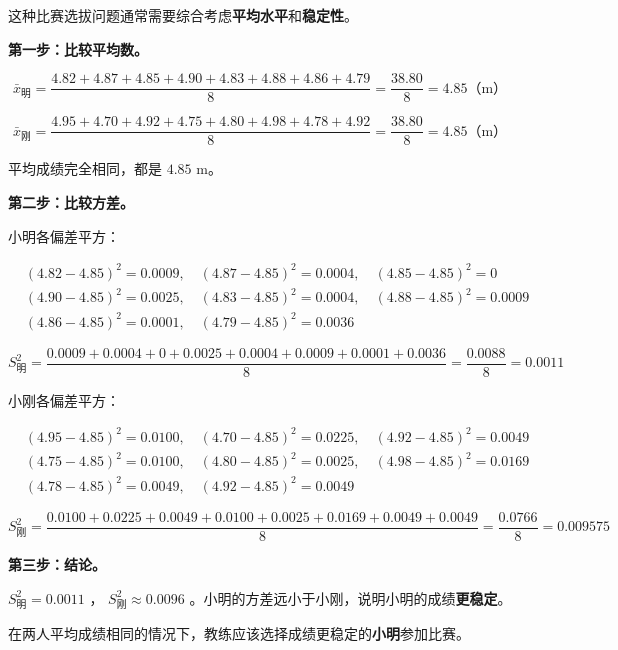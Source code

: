 \begin{understand}


这种比赛选拔问题通常需要综合考虑\textbf{平均水平}和\textbf{稳定性}。

\textbf{第一步：比较平均数。}

\[
\bar{x}_{\text{明}} = \frac{4.82 + 4.87 + 4.85 + 4.90 + 4.83 + 4.88 + 4.86 + 4.79}{8} = \frac{38.80}{8} = 4.85 \text{（m）}
\]


\[
\bar{x}_{\text{刚}} = \frac{4.95 + 4.70 + 4.92 + 4.75 + 4.80 + 4.98 + 4.78 + 4.92}{8} = \frac{38.80}{8} = 4.85 \text{（m）}
\]


平均成绩完全相同，都是 $4.85$ m。

\textbf{第二步：比较方差。}

小明各偏差平方：

\[
\begin{aligned}
&(4.82-4.85)^2 = 0.0009, \quad (4.87-4.85)^2 = 0.0004, \quad (4.85-4.85)^2 = 0 \\
&(4.90-4.85)^2 = 0.0025, \quad (4.83-4.85)^2 = 0.0004, \quad (4.88-4.85)^2 = 0.0009 \\
&(4.86-4.85)^2 = 0.0001, \quad (4.79-4.85)^2 = 0.0036
\end{aligned}
\]


\[
S^2_{\text{明}} = \frac{0.0009 + 0.0004 + 0 + 0.0025 + 0.0004 + 0.0009 + 0.0001 + 0.0036}{8} = \frac{0.0088}{8} = 0.0011
\]


小刚各偏差平方：

\[
\begin{aligned}
&(4.95-4.85)^2 = 0.0100, \quad (4.70-4.85)^2 = 0.0225, \quad (4.92-4.85)^2 = 0.0049 \\
&(4.75-4.85)^2 = 0.0100, \quad (4.80-4.85)^2 = 0.0025, \quad (4.98-4.85)^2 = 0.0169 \\
&(4.78-4.85)^2 = 0.0049, \quad (4.92-4.85)^2 = 0.0049
\end{aligned}
\]


\[
S^2_{\text{刚}} = \frac{0.0100 + 0.0225 + 0.0049 + 0.0100 + 0.0025 + 0.0169 + 0.0049 + 0.0049}{8} = \frac{0.0766}{8} = 0.009575
\]


\textbf{第三步：结论。}

$S^2_{\text{明}} = 0.0011$ ， $S^2_{\text{刚}} \approx 0.0096$ 。小明的方差远小于小刚，说明小明的成绩\textbf{更稳定}。

在两人平均成绩相同的情况下，教练应该选择成绩更稳定的\textbf{小明}参加比赛。

\end{understand}

